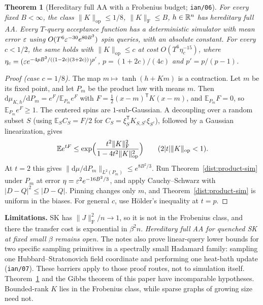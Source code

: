 \documentclass[11pt]{article}
\newtheorem{theorem}{Theorem}[section]
\theoremstyle{definition}\newtheorem{definition}[theorem]{Definition}
\theoremstyle{remark}\newtheorem{remark}[theorem]{Remark}
\newcommand{\E}{\mathbb E}\newcommand{\Prb}{\mathbb P}
\newcommand{\dd}{\mathrm d}\newcommand{\set}[1]{\left\{#1\right\}}
\begin{document}
\begin{theorem}[Hereditary full AA with a Frobenius budget; \texttt{ian/06}]\label{dist:frobenius}
For every fixed \(B<\infty\), the class \(\|K\|_{\mathrm{op}}\le1/8\),
\(\|K\|_{\mathrm F}\le B\), \(h\in\mathbb R^n\) has hereditary full AA. Every
\(T\)-query acceptance function has a deterministic simulator with mean error
\(\varepsilon\) using \(O(T^6\varepsilon^{-30}e^{80B^2})\) spin queries, with an absolute
constant. For every \(c<1/2\), the same holds with \(\|K\|_{\mathrm{op}}\le c\)
at cost \(O(T^6\eta_c^{-15})\), where
\(\eta_c=(\varepsilon e^{-4pB^2/((1-2c)(3+2c))})^{p'}\), \(p=(1+2c)/(4c)\) and
\(p'=p/(p-1)\).
\end{theorem}
\begin{proof}[Proof (case \(c=1/8\))]
The map \(m\mapsto\tanh(h+Km)\) is a contraction. Let \(m\) be its fixed point,
and let \(P_m\) be the product law with means \(m\). Then
\(\dd\mu_{K,h}/\dd P_m=e^F/\E_{P_m}e^F\) with
\(F=\tfrac12(x-m)^{\mathsf T}K(x-m)\), and \(\E_{P_m}F=0\), so
\(\E_{P_m}e^F\ge1\). The centered spins are \(1\)-sub-Gaussian. A decoupling over
a random subset \(S\) (using \(\E_SC_S=F/2\) for
\(C_S=\xi_S^{\mathsf T}K_{S,S^c}\xi_{S^c}\)), followed by a Gaussian
linearization, gives
\[
 \E e^{tF}\le\exp\Bigl(\frac{t^2\|K\|_{\mathrm F}^2}{1-4t^2\|K\|_{\mathrm{op}}^2}\Bigr)
 \qquad(2|t|\|K\|_{\mathrm{op}}<1).
\]
At \(t=2\) this gives \(\|\dd\mu/\dd P_m\|_{L^2(P_m)}\le e^{8B^2/3}\). Run
Theorem~\ref{dist:product-sim} under \(P_m\) at error
\(\eta=\varepsilon^2e^{-16B^2/3}\), and apply Cauchy--Schwarz with
\(|D-Q|^2\le|D-Q|\). Pinning changes only \(m\), and
Theorem~\ref{dist:product-sim} is uniform in the biases. For general \(c\), use
Hölder's inequality at \(t=p\).
\end{proof}
\textbf{Limitations.} SK has \(\|J\|_{\mathrm F}^2/n\to1\), so it is not in
the Frobenius class, and there the transfer cost is exponential in
\(\beta^2n\). \emph{Hereditary full AA for quenched SK at fixed small \(\beta\)
remains open.} The notes also prove linear-query lower bounds for two specific
sampling primitives in a spectrally small Hadamard family: sampling one
Hubbard--Stratonovich field coordinate and performing one heat-bath update
(\texttt{ian/07}). These barriers apply to those proof routes, not to
simulation itself. Theorem~\ref{dist:frobenius} and the Gibbs theorem of this
paper have incomparable hypotheses. Bounded-rank \(K\) lies in the Frobenius
class, while sparse graphs of growing size need not.
\end{document}

